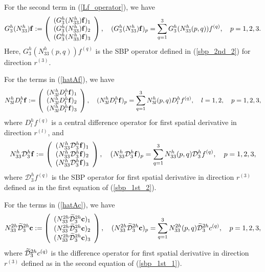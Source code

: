 For the second term in (\ref{Lf_operator}), we have
\begin{align*}\label{3_10_2}
{{G}}_3^{h}({N}_{33}^{h}){\bf f} := \left(\begin{array}{c}
({{G}}_3^{h}({N}_{33}^{h}){\bf f})_1 \\
({{G}}_3^{h}({N}_{33}^{h}){\bf f})_2 \\
({{G}}_3^{h}({N}_{33}^{h}){\bf f})_3 
\end{array}\right), \quad ({{G}}_3^{h}({N}_{33}^{h}){\bf f})_p = \sum_{q = 1}^{3} {G}_3^{h}(N_{33}^{h}(p,q)) {f}^{(q)},\quad p = 1,2,3.
\end{align*}
Here, ${G}_3^{h}(N_{33}^{h}(p,q)) {f}^{(q)}$ is the SBP operator defined in (\ref{sbp_2nd_2}) for direction $r^{(3)}$. 

For the terms in (\ref{hatAf}), we have
\begin{align*}\label{gamma_D} 
{N}_{3l}^hD_l^h{\bf f} := \left(\begin{array}{c}
({N}_{3l}^hD_l^h{\bf f})_1 \\
({N}_{3l}^hD_l^h{\bf f})_2 \\
({N}_{3l}^hD_l^h{\bf f})_3 
\end{array}\right), \quad ({N}_{3l}^hD_l^h{\bf f})_p = \sum_{q = 1}^{3} N_{3l}^h(p,q)D_l^h{f}^{(q)},\quad l = 1,2, \quad p = 1,2,3,
\end{align*}
where $D_l^h{f}^{(q)}$ is a central difference operator for first spatial derivative in direction $r^{(l)}$, and
\begin{align*}\label{gamma_D1}
{N}_{33}^h\mathcal{D}_3^h{\bf f} := \left(\begin{array}{c}
({N}_{33}^h\mathcal{D}_3^h{\bf f})_1 \\
({N}_{33}^h\mathcal{D}_3^h{\bf f})_2 \\
({N}_{33}^h\mathcal{D}_3^h{\bf f})_3 
\end{array}\right), \quad ({N}_{33}^h\mathcal{D}_3^h{\bf f})_p = \sum_{q = 1}^{3} N_{33}^h(p,q)\mathcal{D}_3^h{f}^{(q)},\quad p = 1,2,3,
\end{align*}
where $\mathcal{D}_3^h{f}^{(q)}$ is the SBP operator for first spatial derivative in direction $r^{(3)}$ defined as in the first equation of (\ref{sbp_1st_2}).

For the terms in (\ref{hatAc}), we have
\begin{align*}\label{3_17}
{N}_{33}^{2h}\wt{\mathcal{D}}_3^{2h}{\bf c} := \left(\begin{array}{c}
({N}_{33}^{2h}\wt{\mathcal{D}}_3^{2h}{\bf c})_1 \\
({N}_{33}^{2h}\wt{\mathcal{D}}_3^{2h}{\bf c})_2 \\
({N}_{33}^{2h}\wt{\mathcal{D}}_3^{2h}{\bf c})_3 
\end{array}\right), \quad ({N}_{33}^{2h}\wt{\mathcal{D}}_3^{2h}{\bf c})_p = \sum_{q = 1}^{3} N_{33}^{2h}(p,q)\wt{\mathcal{D}}_3^{2h}{c}^{(q)},\quad p = 1,2,3,
\end{align*}
where $\widetilde{\mathcal{D}}_3^{2h}{c}^{(q)}$ is the difference operator for first spatial derivative in direction $r^{(3)}$ defined as in the second equation of (\ref{sbp_1st_1}).